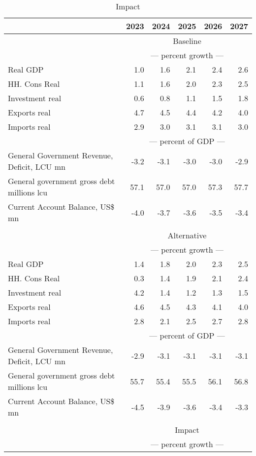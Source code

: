 \documentclass{article}
\begin{document}
\begin{table}[ht]
\caption{Impact}
\begin{tabular}{lrrrrr}
\toprule
 & 2023 & 2024 & 2025 & 2026 & 2027 \\
\midrule
&\multicolumn{5}{c}{Baseline}           \\
&\multicolumn{5}{c}{--- percent growth ---}           \\
Real GDP & 1.0 & 1.6 & 2.1 & 2.4 & 2.6 \\
HH. Cons Real & 1.1 & 1.6 & 2.0 & 2.3 & 2.5 \\
Investment real & 0.6 & 0.8 & 1.1 & 1.5 & 1.8 \\
Exports real & 4.7 & 4.5 & 4.4 & 4.2 & 4.0 \\
Imports real & 2.9 & 3.0 & 3.1 & 3.1 & 3.0 \\
&\multicolumn{5}{c}{--- percent of GDP ---}           \\
General Government Revenue, Deficit, LCU mn & -3.2 & -3.1 & -3.0 & -3.0 & -2.9 \\
General government gross debt millions lcu & 57.1 & 57.0 & 57.0 & 57.3 & 57.7 \\
Current Account Balance, US\$ mn & -4.0 & -3.7 & -3.6 & -3.5 & -3.4 \\
&\multicolumn{5}{c}{ }           \\
&\multicolumn{5}{c}{Alternative}           \\
&\multicolumn{5}{c}{--- percent growth ---}           \\
Real GDP & 1.4 & 1.8 & 2.0 & 2.3 & 2.5 \\
HH. Cons Real & 0.3 & 1.4 & 1.9 & 2.1 & 2.4 \\
Investment real & 4.2 & 1.4 & 1.2 & 1.3 & 1.5 \\
Exports real & 4.6 & 4.5 & 4.3 & 4.1 & 4.0 \\
Imports real & 2.8 & 2.1 & 2.5 & 2.7 & 2.8 \\
&\multicolumn{5}{c}{--- percent of GDP ---}           \\
General Government Revenue, Deficit, LCU mn & -2.9 & -3.1 & -3.1 & -3.1 & -3.1 \\
General government gross debt millions lcu & 55.7 & 55.4 & 55.5 & 56.1 & 56.8 \\
Current Account Balance, US\$ mn & -4.5 & -3.9 & -3.6 & -3.4 & -3.3 \\
&\multicolumn{5}{c}{ }           \\
&\multicolumn{5}{c}{Impact}           \\
&\multicolumn{5}{c}{--- percent growth ---}           \\

\end{tabular}
\end{table}
\end{document}

